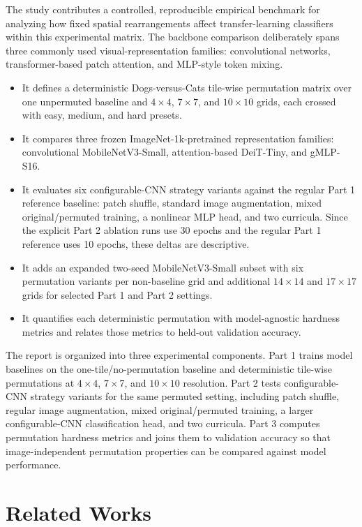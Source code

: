 \documentclass[12pt]{article}
\begin{document}
The study contributes a controlled, reproducible empirical benchmark for analyzing how fixed spatial rearrangements affect transfer-learning classifiers within this experimental matrix. The backbone comparison deliberately spans three commonly used visual-representation families: convolutional networks, transformer-based patch attention, and MLP-style token mixing.
\begin{itemize}
  \item It defines a deterministic Dogs-versus-Cats tile-wise permutation matrix over one unpermuted baseline and $4 \times 4$, $7 \times 7$, and $10 \times 10$ grids, each crossed with easy, medium, and hard presets.
  \item It compares three frozen ImageNet-1k-pretrained representation families: convolutional MobileNetV3-Small, attention-based DeiT-Tiny, and gMLP-S16.
  \item It evaluates six configurable-CNN strategy variants against the regular Part 1 reference baseline: patch shuffle, standard image augmentation, mixed original/permuted training, a nonlinear MLP head, and two curricula. Since the explicit Part 2 ablation runs use 30 epochs and the regular Part 1 reference uses 10 epochs, these deltas are descriptive.
  \item It adds an expanded two-seed MobileNetV3-Small subset with six permutation variants per non-baseline grid and additional $14 \times 14$ and $17 \times 17$ grids for selected Part 1 and Part 2 settings.
  \item It quantifies each deterministic permutation with model-agnostic hardness metrics and relates those metrics to held-out validation accuracy.
\end{itemize}

The report is organized into three experimental components. Part 1 trains model baselines on the one-tile/no-permutation baseline and deterministic tile-wise permutations at $4 \times 4$, $7 \times 7$, and $10 \times 10$ resolution. Part 2 tests configurable-CNN strategy variants for the same permuted setting, including patch shuffle, regular image augmentation, mixed original/permuted training, a larger configurable-CNN classification head, and two curricula. Part 3 computes permutation hardness metrics and joins them to validation accuracy so that image-independent permutation properties can be compared against model performance.

\section{Related Works}
\end{document}
